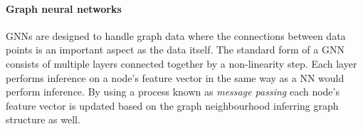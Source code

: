 \paragraph{Graph neural networks} 
GNNs are designed to handle graph data where the connections between data points is an important aspect as the data itself.
The standard form of a GNN 
consists of multiple layers connected together by a non-linearity step.
Each layer performs inference on a node's feature vector in the same way as a NN would perform inference.
By using a process known as \emph{message passing} each node's feature vector is updated based on the graph neighbourhood inferring graph structure as well.




